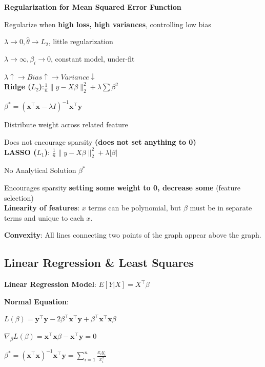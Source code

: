 \documentclass[8pt]{extarticle}
\begin{document}
\textbf{Regularization for Mean Squared Error Function}\par
Regularize when \textbf{high loss, high variances}, controlling low bias

$\lambda \rightarrow 0,  \hat{\theta} \rightarrow L_2 $, little regularization\par
$\lambda \rightarrow \infty,  \beta_i \rightarrow 0 $, constant model, under-fit \par
$\lambda \uparrow \rightarrow Bias \uparrow \rightarrow Variance \downarrow $\\

\textbf{Ridge ($L_2$)}:$\frac{1}{n}\|{y-X\beta}\|_2^2 + \lambda \sum \beta^2$ \par
$\beta^* = (\mathbf{x}^\top \mathbf{x} - \lambda I)^{-1}\mathbf{x}^\top \mathbf{y}$\par
Distribute weight across related feature \par
Does not encourage sparsity \textbf{(does not set anything to 0)} \\
 
\textbf{LASSO ($L_1$)}: $\frac{1}{n}\|{y-X\beta}\|_2^2 + \lambda |\beta |$ \par
No Analytical Solution $\beta^*$ \par
Encourages sparsity \textbf{setting some weight to 0, decrease some} (feature selection) \\

\textbf{Linearity of features}: $x$ terms can be polynomial, but $\beta$ must be in separate terms and unique to each $x$. \par
\textbf{Convexity}: All lines connecting two points of the graph appear above the graph.\\
\hline

\subsection*{Linear Regression \& Least Squares}
\textbf{Linear Regression Model}: $E[Y|X]=X^\top \beta$ 

\textbf{Normal Equation}: \par
$L(\beta)=\mathbf{y}^\top \mathbf{y}-2\beta^\top \mathbf{x}^\top \mathbf{y}+\beta ^\top \mathbf{x}^\top \mathbf{x}\beta$ \par
$\nabla_\beta L(\beta)= \mathbf{x}^\top \mathbf{x}\beta -\mathbf{x}^\top\mathbf{y} = 0 $ \par
$\beta^* = (\mathbf{x}^\top \mathbf{x})^{-1}\mathbf{x}^\top \mathbf{y} = \sum^{n}_{i=1} \frac{x_iy_i}{x_i^2}$ \\
\end{document}
